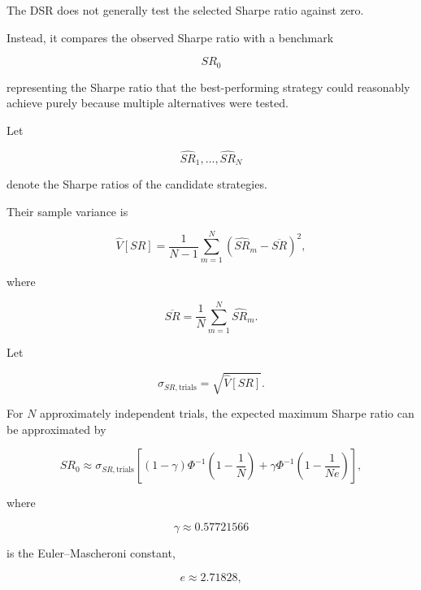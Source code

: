 \documentclass[11pt,a4paper]{article}
\begin{document}
The DSR does not generally test the selected Sharpe ratio against zero.

Instead, it compares the observed Sharpe ratio with a benchmark

\begin{equation}
\boxed{
SR_0
}
\end{equation}

representing the Sharpe ratio that the best-performing strategy could reasonably
achieve purely because multiple alternatives were tested.

Let

\begin{equation}
\widehat{SR}_1,
\ldots,
\widehat{SR}_N
\end{equation}

denote the Sharpe ratios of the candidate strategies.

Their sample variance is

\begin{equation}
\boxed{
\widehat{V}[SR]
=
\frac{1}{N-1}
\sum_{m=1}^{N}
\left(
\widehat{SR}_m
-
\overline{SR}
\right)^2,
}
\end{equation}

where

\begin{equation}
\overline{SR}
=
\frac{1}{N}
\sum_{m=1}^{N}
\widehat{SR}_m.
\end{equation}

Let

\begin{equation}
\sigma_{SR,\mathrm{trials}}
=
\sqrt{
\widehat{V}[SR]
}.
\end{equation}

For $N$ approximately independent trials, the expected maximum Sharpe ratio can
be approximated by

\begin{equation}
\boxed{
SR_0
\approx
\sigma_{SR,\mathrm{trials}}
\left[
(1-\gamma)
\Phi^{-1}
\left(
1-\frac{1}{N}
\right)
+
\gamma
\Phi^{-1}
\left(
1-\frac{1}{Ne}
\right)
\right],
}
\end{equation}

where

\begin{equation}
\gamma
\approx
0.57721566
\end{equation}

is the Euler--Mascheroni constant,

\begin{equation}
e
\approx
2.71828,
\end{equation}
\end{document}
